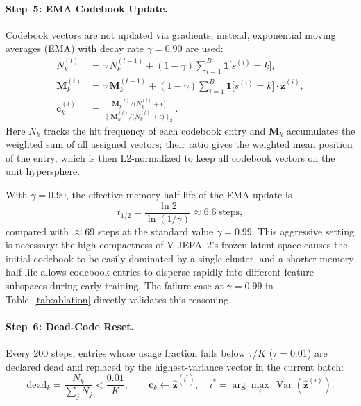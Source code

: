 \documentclass{article}
\begin{document}
\paragraph{Step~5: EMA Codebook Update.}
Codebook vectors are not updated via gradients; instead, exponential moving
averages (EMA) with decay rate $\gamma = 0.90$ are used:
%
\begin{align}
  N_k^{(t)}
  &= \gamma\,N_k^{(t-1)}
   + (1-\gamma)\sum_{i=1}^{B}\mathbf{1}\bigl[s^{(i)}=k\bigr], \\[4pt]
  \mathbf{M}_k^{(t)}
  &= \gamma\,\mathbf{M}_k^{(t-1)}
   + (1-\gamma)\sum_{i=1}^{B}\mathbf{1}\bigl[s^{(i)}=k\bigr]
     \cdot\hat{\mathbf{z}}^{(i)}, \\[4pt]
  \mathbf{c}_k^{(t)}
  &= \frac{\mathbf{M}_k^{(t)}/\bigl(N_k^{(t)}+\epsilon\bigr)}
          {\bigl\|\mathbf{M}_k^{(t)}/\bigl(N_k^{(t)}+\epsilon\bigr)\bigr\|_2}.
\end{align}
%
Here $N_k$ tracks the hit frequency of each codebook entry and $\mathbf{M}_k$
accumulates the weighted sum of all assigned vectors; their ratio gives the
weighted mean position of the entry, which is then L2-normalized to keep all
codebook vectors on the unit hypersphere.

With $\gamma = 0.90$, the effective memory half-life of the EMA update is
%
\begin{equation}
  t_{1/2} = \frac{\ln 2}{\ln(1/\gamma)} \approx 6.6\ \text{steps},
\end{equation}
%
compared with $\approx\!69$ steps at the standard value $\gamma = 0.99$.  This
aggressive setting is necessary: the high compactness of V-JEPA~2's frozen
latent space causes the initial codebook to be easily dominated by a single
cluster, and a shorter memory half-life allows codebook entries to disperse
rapidly into different feature subspaces during early training.  The failure
case at $\gamma = 0.99$ in Table~\ref{tab:ablation} directly validates this
reasoning.

\paragraph{Step~6: Dead-Code Reset.}
Every 200 steps, entries whose usage fraction falls below $\tau/K$
($\tau = 0.01$) are declared dead and replaced by the highest-variance vector
in the current batch:
%
\begin{equation}
  \text{dead}_k
  = \frac{N_k}{\sum_j N_j} < \frac{0.01}{K},
  \qquad
  \mathbf{c}_k \leftarrow \hat{\mathbf{z}}^{(i^*)},
  \quad
  i^* = \arg\max_{i}\,\operatorname{Var}(\hat{\mathbf{z}}^{(i)}).
\end{equation}
\end{document}
